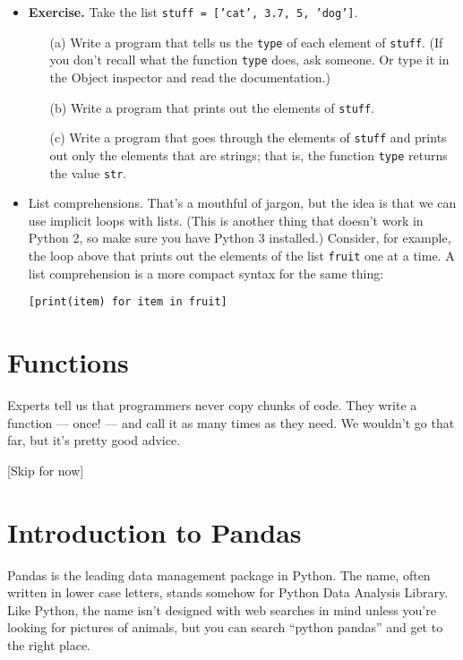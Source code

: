 \documentclass[11pt]{article}
\begin{document}
\begin{itemize}
\item {\bf Exercise.}
Take the list {\tt stuff = ['cat', 3.7, 5, 'dog']}.
\begin{itemize}
\item [(a)]Write a program that tells us the {\tt type} of each element of {\tt stuff}.
(If you don't recall what the function {\tt type} does, ask someone.
Or type it in the  Object inspector and read the documentation.)
\item [(b)]  Write a program that prints out the elements of {\tt stuff}.
\item [(c)]  Write a program that goes through the elements of {\tt stuff}
and prints out only the elements that are strings;
that is, the function {\tt type} returns the value {\tt str}.
\end{itemize}


\item List comprehensions.
That's a mouthful of jargon, but the idea is that we can
use implicit loops with lists.
(This is another thing that doesn't work in Python 2, so make sure you have Python 3 installed.)
Consider, for example, the loop above that prints out the elements of the list {\tt fruit} one at a time.
A list comprehension is a more compact syntax for the same thing:
\begin{verbatim}
[print(item) for item in fruit]
\end{verbatim}


\end{itemize}

\section{Functions}

Experts tell us that programmers never copy chunks of code.
They write a function --- once! --- and call it as
many times as they need.
We wouldn't go that far, but it's pretty good advice.

[Skip for now]



\section{Introduction to Pandas}

Pandas is the leading data management package in Python.
The name, often written in lower case letters,
stands somehow for Python Data Analysis Library.
Like Python, the name isn't designed with web searches in mind
unless you're looking for pictures of animals,
but you can search ``python pandas'' and get to the right place.
\end{document}
